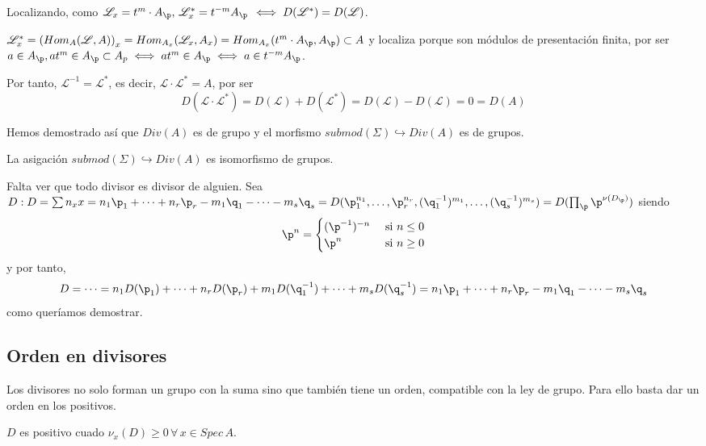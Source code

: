     \begin{lem}
    Localizando, como $\mathscr L_x = t^m \cdot A_\p, \, \mathscr L_x^* = t^{-m} A_\p \, \iff D(\mathscr L^*) = D(\mathscr L)$.  
    \end{lem} 
    \begin{dem}
        $\mathscr L_x^* = \left(Hom_A(\mathscr L,A)\right)_x = Hom_{A_x} (\mathscr L_x, A_x) = Hom_{A_x}(t^m \cdot A_\p, A_\p) \subset A$ y localiza porque son m\'odulos de presentaci\'on finita, por ser $a\in A_\p, at^m \in A_\p \subset A_p \iff at^m \in A_\p  \iff a\in t^{-m} A_\p$.  
    \end{dem}
    \begin{cor}
        Por tanto, $\mathscr L^{-1} = \mathscr L^*$, es decir, $\mathscr L \cdot \mathscr L^* = A$, por ser 
        $$D(\mathscr L \cdot \mathscr L^*) = D(\mathscr L) + D(\mathscr L^*) = D(\mathscr L) - D(\mathscr L) = 0 =D(A)$$
    \end{cor}
    Hemos demostrado as\'i que $Div(A)$ es de grupo y el morfismo $submod(\Sigma)\hookrightarrow Div(A)$ es de grupos. 
    \begin{teo}
        La asigaci\'on $submod(\Sigma)\hookrightarrow Div(A)$ es isomorfismo de grupos. 
    \end{teo}
    \begin{dem}
        Falta ver que todo divisor es divisor de alguien. Sea $D: D= \sum n_x x = n_1 \p_1 + \cdots + n_r \p_r - m_1 \q_1 - \cdots - m_s \q_s = D (\p_1^{n_1}, \ldots, \p_r^{n_r}, (\q_1^{-1})^{m_1},  \ldots, (\q_s^{-1})^{m_s}) = D(\prod_\p \p^{\nu(D_\p)}) $ siendo 
        $$\p^n = \begin{cases}
            (\p^{-1})^{-n} & \text{ si } n \le 0 \\ \p^n & \text{ si } n \ge 0 
        \end{cases}$$
        y por tanto, 
        $$D = \cdots = n_1 D(\p_1)  + \cdots + n_r D(\p_r) + m_1 D(\q_1^{-1}) + \cdots + m_s D(\q_s^{-1}) =  n_1 \p_1 + \cdots + n_r \p_r - m_1 \q_1 - \cdots - m_s \q_s  $$
        como quer\'iamos demostrar. 
    \end{dem}
    \subsection{Orden en divisores}
    Los divisores no solo forman un grupo con la suma sino que tambi\'en tiene un orden, compatible con la ley de grupo. Para ello basta dar un orden en los positivos. 

    $D$ es positivo cuado $\nu_x(D) \ge 0\, \forall \, x\in Spec\, A$.

